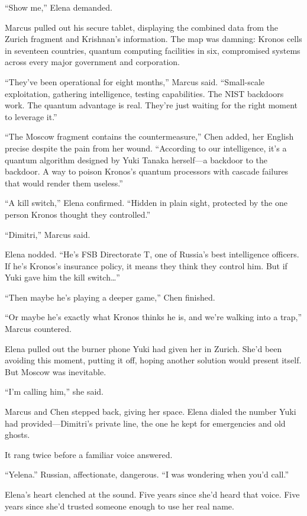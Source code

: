 ``Show me,'' Elena demanded.

Marcus pulled out his secure tablet, displaying the combined data from the Zurich fragment and Krishnan's information. The map was damning: Kronos cells in seventeen countries, quantum computing facilities in six, compromised systems across every major government and corporation.

``They've been operational for eight months,'' Marcus said. ``Small-scale exploitation, gathering intelligence, testing capabilities. The NIST backdoors work. The quantum advantage is real. They're just waiting for the right moment to leverage it.''

``The Moscow fragment contains the countermeasure,'' Chen added, her English precise despite the pain from her wound. ``According to our intelligence, it's a quantum algorithm designed by Yuki Tanaka herself---a backdoor to the backdoor. A way to poison Kronos's quantum processors with cascade failures that would render them useless.''

``A kill switch,'' Elena confirmed. ``Hidden in plain sight, protected by the one person Kronos thought they controlled.''

``Dimitri,'' Marcus said.

Elena nodded. ``He's FSB Directorate T, one of Russia's best intelligence officers. If he's Kronos's insurance policy, it means they think they control him. But if Yuki gave him the kill switch\ldots{}''

``Then maybe he's playing a deeper game,'' Chen finished.

``Or maybe he's exactly what Kronos thinks he is, and we're walking into a trap,'' Marcus countered.

Elena pulled out the burner phone Yuki had given her in Zurich. She'd been avoiding this moment, putting it off, hoping another solution would present itself. But Moscow was inevitable.

``I'm calling him,'' she said.

Marcus and Chen stepped back, giving her space. Elena dialed the number Yuki had provided---Dimitri's private line, the one he kept for emergencies and old ghosts.

It rang twice before a familiar voice answered.

``Yelena.'' Russian, affectionate, dangerous. ``I was wondering when you'd call.''

Elena's heart clenched at the sound. Five years since she'd heard that voice. Five years since she'd trusted someone enough to use her real name.

